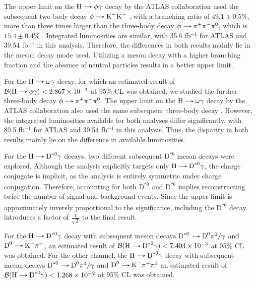 The upper limit on the $\text{H}\decaysto \phi\gamma$ decay by the ATLAS collaboration used the subsequent two-body decay $\phi\decaysto \text{K}^+\text{K}^-$ \cite{ATLAS:2017gko}, with a branching ratio of $49.1\pm0.5$\%, more than three times larger than the three-body decay $\phi\decaysto \pi^+\pi^-\pi^0$, which is $15.4\pm0.4$\% \cite{PDG}. Integrated luminosities are similar, with 35.6 fb$^{-1}$ for ATLAS and 39.54 fb$^{-1}$ in this analysis. Therefore, the differences in both results mainly lie in the meson decay mode used. Utilizing a meson decay with a higher branching fraction and the absence of neutral particles results in a better upper limit.

For the $\text{H}\decaysto \omega\gamma$ decay, for which an estimated result of $\mathcal{B}(\text{H}\decaysto \phi\gamma) < 2.867 \times 10^{-3}$ at 95\% CL was obtained, we studied the further three-body decay $\phi\decaysto \pi^+\pi^-\pi^0$. The upper limit on the $\text{H}\decaysto \omega\gamma$ decay by the ATLAS collaboration also used the same subsequent three-body decay \cite{ATLAS:2023alf}. However, the integrated luminosities available for both analyses differ significantly, with 89.5 fb$^{-1}$ for ATLAS and 39.54 fb$^{-1}$ in this analysis. Thus, the disparity in both results mainly lie on the difference in available luminosities.

For the $\text{H}\decaysto \text{D}^{*0}\gamma$ decays, two different subsequent $\text{D}^{*0}$ meson decays were explored. Although the analysis explicitly targets only $\text{H}\decaysto \text{D}^{*0}\gamma$, the charge conjugate is implicit, as the analysis is entirely symmetric under charge conjugation. Therefore, accounting for both $\text{D}^{*0}$ and $\overline{\text{D}^{*0}}$ implies reconstructing twice the number of signal and background events. Since the upper limit is approximately inversly proportional to the significance, including the $\overline{\text{D}^{*0}}$ decay introduces a factor of $\frac{1}{\sqrt{2}}$ to the final result.

For the $\text{H}\decaysto \text{D}^{*0}\gamma$ decay with subsequent meson decays $\text{D}^{*0}\decaysto \text{D}^{0}\pi^{0}/\gamma$ and $\text{D}^{0}\decaysto \text{K}^{-}\pi^{+}$, an estimated result of $\mathcal{B}(\text{H}\decaysto \text{D}^{*0}\gamma) < 7.403 \times 10^{-3}$ at 95\% CL was obtained. For the other channel, the $\text{H}\decaysto \text{D}^{*0}\gamma$ decay with subsequent meson decays $\text{D}^{*0}\decaysto \text{D}^{0}\pi^{0}/\gamma$ and \linebreak$\text{D}^{0}\decaysto \text{K}^{-}\pi^{+}\pi^{0}$ an estimated result of $\mathcal{B}(\text{H}\decaysto \text{D}^{*0}\gamma) < 1.268 \times 10^{-2}$ at 95\% CL was obtained.

